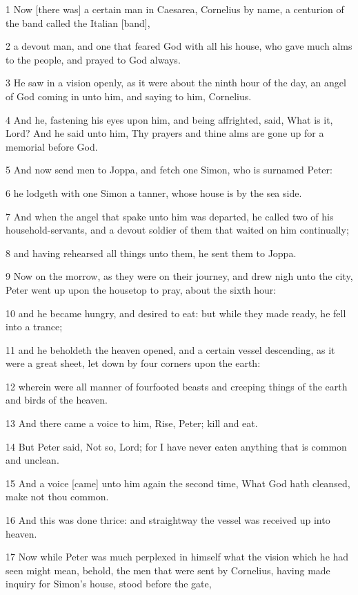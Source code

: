 \par 1 Now [there was] a certain man in Caesarea, Cornelius by name, a centurion of the band called the Italian [band],
\par 2 a devout man, and one that feared God with all his house, who gave much alms to the people, and prayed to God always.
\par 3 He saw in a vision openly, as it were about the ninth hour of the day, an angel of God coming in unto him, and saying to him, Cornelius.
\par 4 And he, fastening his eyes upon him, and being affrighted, said, What is it, Lord? And he said unto him, Thy prayers and thine alms are gone up for a memorial before God.
\par 5 And now send men to Joppa, and fetch one Simon, who is surnamed Peter:
\par 6 he lodgeth with one Simon a tanner, whose house is by the sea side.
\par 7 And when the angel that spake unto him was departed, he called two of his household-servants, and a devout soldier of them that waited on him continually;
\par 8 and having rehearsed all things unto them, he sent them to Joppa.
\par 9 Now on the morrow, as they were on their journey, and drew nigh unto the city, Peter went up upon the housetop to pray, about the sixth hour:
\par 10 and he became hungry, and desired to eat: but while they made ready, he fell into a trance;
\par 11 and he beholdeth the heaven opened, and a certain vessel descending, as it were a great sheet, let down by four corners upon the earth:
\par 12 wherein were all manner of fourfooted beasts and creeping things of the earth and birds of the heaven.
\par 13 And there came a voice to him, Rise, Peter; kill and eat.
\par 14 But Peter said, Not so, Lord; for I have never eaten anything that is common and unclean.
\par 15 And a voice [came] unto him again the second time, What God hath cleansed, make not thou common.
\par 16 And this was done thrice: and straightway the vessel was received up into heaven.
\par 17 Now while Peter was much perplexed in himself what the vision which he had seen might mean, behold, the men that were sent by Cornelius, having made inquiry for Simon's house, stood before the gate,
